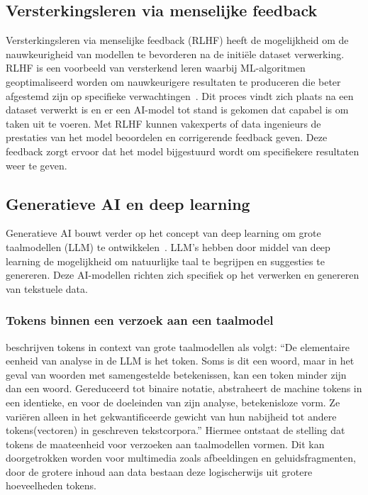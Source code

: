 \subsection{Versterkingsleren via menselijke feedback}
\label{subsec:versterkingsleren-via-menselijke-feedback}
Versterkingsleren via menselijke feedback (RLHF) heeft de mogelijkheid om de nauwkeurigheid van modellen te bevorderen na de initi\"ele dataset verwerking.
RLHF is een voorbeeld van versterkend leren waarbij ML-algoritmen geoptimaliseerd worden om nauwkeurigere resultaten te produceren die beter afgestemd zijn op specifieke verwachtingen~\autocite{Balakrishnan2024}.
Dit proces vindt zich plaats na een dataset verwerkt is en er een AI-model tot stand is gekomen dat capabel is om taken uit te voeren.
Met RLHF kunnen vakexperts of data ingenieurs de prestaties van het model beoordelen en corrigerende feedback geven.
Deze feedback zorgt ervoor dat het model bijgestuurd wordt om specifiekere resultaten weer te geven.

\subsection{Generatieve AI en deep learning}
\label{subsec:generatieve-ai-en-deep-learning}
Generatieve AI bouwt verder op het concept van deep learning om grote taalmodellen (LLM) te ontwikkelen~\autocite{Shen2024}.
LLM's hebben door middel van deep learning de mogelijkheid om natuurlijke taal te begrijpen en suggesties te genereren.
Deze AI-modellen richten zich specifiek op het verwerken en genereren van tekstuele data.

\subsubsection{Tokens binnen een verzoek aan een taalmodel}
\textcite{Cope2023} beschrijven tokens in context van grote taalmodellen als volgt:
``De elementaire eenheid van analyse in de LLM is het token.
Soms is dit een woord, maar in het geval van woorden met samengestelde betekenissen, kan een token minder zijn dan een woord.
Gereduceerd tot binaire notatie, abstraheert de machine tokens in een identieke, en voor de doeleinden van zijn analyse, betekenisloze vorm.
Ze variëren alleen in het gekwantificeerde gewicht van hun nabijheid tot andere tokens(vectoren) in geschreven tekstcorpora.''
Hiermee ontstaat de stelling dat tokens de maateenheid voor verzoeken aan taalmodellen vormen.
Dit kan doorgetrokken worden voor multimedia zoals afbeeldingen en geluidsfragmenten, door de grotere inhoud aan data bestaan deze logischerwijs uit grotere hoeveelheden tokens.